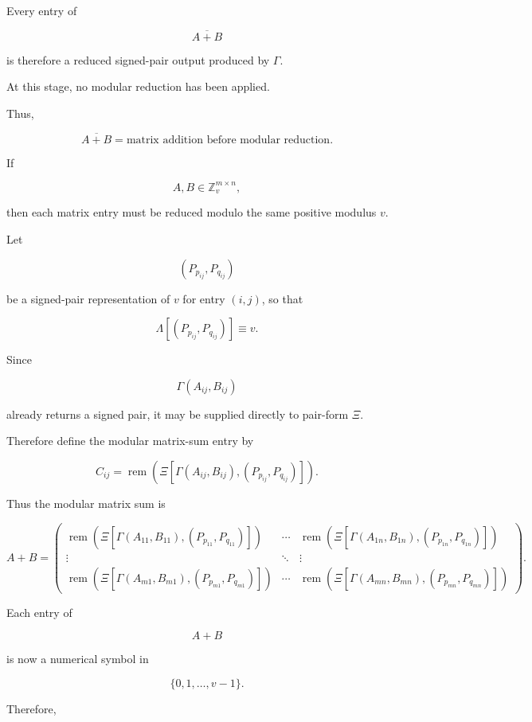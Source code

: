 \documentclass[12pt]{article}
\begin{document}
Every entry of

\[
\overline{A+B}
\]

is therefore a reduced signed-pair output produced by \(\Gamma\).

At this stage, no modular reduction has been applied.

Thus,

\[
\boxed{
\overline{A+B}
=
\text{matrix addition before modular reduction}.
}
\]

If

\[
A,B\in\mathbb Z_v^{m\times n},
\]

then each matrix entry must be reduced modulo the same positive modulus \(v\).

Let

\[
(P_{p_{ij}},P_{q_{ij}})
\]

be a signed-pair representation of \(v\) for entry \((i,j)\), so that

\[
\boxed{
\Lambda[(P_{p_{ij}},P_{q_{ij}})]\equiv v.
}
\]

Since

\[
\Gamma(A_{ij},B_{ij})
\]

already returns a signed pair, it may be supplied directly to pair-form \(\Xi\).

Therefore define the modular matrix-sum entry by

\[
\boxed{
C_{ij}
=
\operatorname{rem}
\left(
\Xi
\left[
\Gamma(A_{ij},B_{ij}),
(P_{p_{ij}},P_{q_{ij}})
\right]
\right).
}
\]

Thus the modular matrix sum is

\[
\boxed{
A+B
=
\begin{pmatrix}
\operatorname{rem}
\left(
\Xi
\left[
\Gamma(A_{11},B_{11}),
(P_{p_{11}},P_{q_{11}})
\right]
\right)
&
\cdots
&
\operatorname{rem}
\left(
\Xi
\left[
\Gamma(A_{1n},B_{1n}),
(P_{p_{1n}},P_{q_{1n}})
\right]
\right)
\\[12pt]
\vdots
&
\ddots
&
\vdots
\\[12pt]
\operatorname{rem}
\left(
\Xi
\left[
\Gamma(A_{m1},B_{m1}),
(P_{p_{m1}},P_{q_{m1}})
\right]
\right)
&
\cdots
&
\operatorname{rem}
\left(
\Xi
\left[
\Gamma(A_{mn},B_{mn}),
(P_{p_{mn}},P_{q_{mn}})
\right]
\right)
\end{pmatrix}.
}
\]

Each entry of

\[
A+B
\]

is now a numerical symbol in

\[
\{0,1,\ldots,v-1\}.
\]

Therefore,
\end{document}
